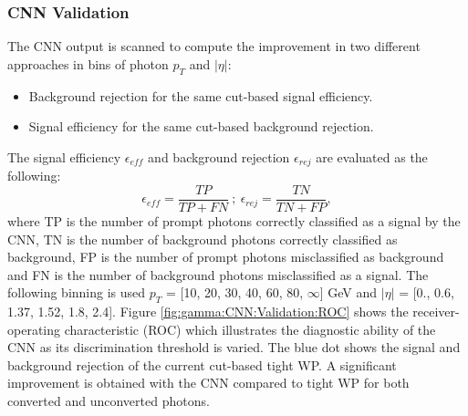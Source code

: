\subsubsection{CNN Validation}
\label{gamma:CNN:Validation}
The CNN output is scanned to compute the improvement in two different approaches in bins of photon $p_T$ and $|\eta|$: 
\begin{itemize}
    \item Background rejection for the same cut-based signal efficiency.
    \item Signal efficiency for the same cut-based background rejection.
\end{itemize} 
The signal efficiency $\epsilon_{eff}$ and background rejection $\epsilon_{rej}$ are evaluated as the following:
\begin{equation}
    \label{eq:eff}
    \epsilon_{eff} = \frac{TP}{TP+FN} \ ; \ \epsilon_{rej} = \frac{TN}{TN+FP},
\end{equation}
where TP is the number of prompt photons correctly classified as a signal by the CNN, TN is the number of background photons correctly classified as background, FP is the number of prompt photons misclassified as background and FN is the number of background photons misclassified as a signal. The following binning is used $p_T$ = [10, 20, 30, 40, 60, 80, $\infty$] GeV and $|\eta|$ = [0., 0.6, 1.37, 1.52, 1.8, 2.4].
Figure \ref{fig:gamma:CNN:Validation:ROC} shows the receiver-operating characteristic (ROC) which illustrates the diagnostic ability of the CNN as its discrimination threshold is varied. The blue dot shows the signal and background rejection of the current cut-based tight WP. A significant improvement is obtained with the CNN compared to tight WP for both converted and unconverted photons. 
